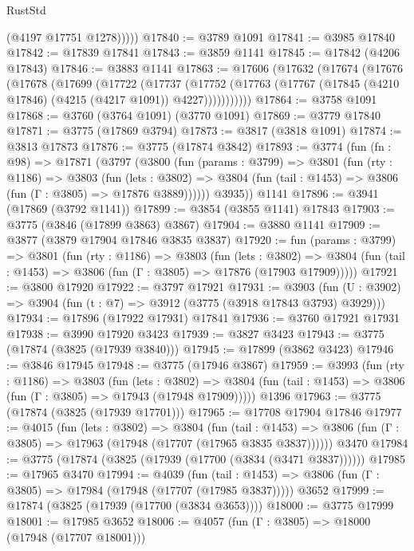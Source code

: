\begin{lexlean}{RustStd}
\begin{coremodule}
            (@4197 @17751 @1278)))))
@17840 := @3789 @1091
@17841 := @3985 @17840
@17842 := @17839 @17841
@17843 := @3859 @1141
@17845 := @17842 (@4206 @17843)
@17846 := @3883 @1141
@17863 := @17606
    (@17632
      (@17674
        (@17676
          (@17678
            (@17699
              (@17722
                (@17737
                  (@17752
                    (@17763 (@17767 (@17845 (@4210 @17846) (@4215 (@4217 @1091)) @4227)))))))))))
@17864 := @3758 @1091
@17868 := @3760 (@3764 @1091) (@3770 @1091)
@17869 := @3779 @17840
@17871 := @3775 (@17869 @3794)
@17873 := @3817 (@3818 @1091)
@17874 := @3813 @17873
@17876 := @3775 (@17874 @3842)
@17893 := @3774
    (fun (fn : @98) =>
    @17871
      (@3797
        (@3800
          (fun (params : @3799) =>
          @3801
            (fun (rty : @1186) =>
            @3803
              (fun (lets : @3802) =>
              @3804 (fun (tail : @1453) => @3806 (fun (Γ : @3805) => @17876 @3889))))))
        @3935))
    @1141
@17896 := @3941 (@17869 (@3792 @1141))
@17899 := @3854 (@3855 @1141) @17843
@17903 := @3775 (@3846 (@17899 @3863) @3867)
@17904 := @3880 @1141
@17909 := @3877 (@3879 @17904 @17846 @3835 @3837)
@17920 := fun (params : @3799) =>
  @3801
    (fun (rty : @1186) =>
    @3803
      (fun (lets : @3802) =>
      @3804 (fun (tail : @1453) => @3806 (fun (Γ : @3805) => @17876 (@17903 @17909)))))
@17921 := @3800 @17920
@17922 := @3797 @17921
@17931 := @3903
    (fun (U : @3902) => @3904 (fun (t : @7) => @3912 (@3775 (@3918 @17843 @3793) @3929)))
@17934 := @17896 (@17922 @17931) @17841
@17936 := @3760 @17921 @17931
@17938 := @3990 @17920 @3423
@17939 := @3827 @3423
@17943 := @3775 (@17874 (@3825 (@17939 @3840)))
@17945 := @17899 (@3862 @3423)
@17946 := @3846 @17945
@17948 := @3775 (@17946 @3867)
@17959 := @3993
    (fun (rty : @1186) =>
    @3803
      (fun (lets : @3802) =>
      @3804 (fun (tail : @1453) => @3806 (fun (Γ : @3805) => @17943 (@17948 @17909)))))
    @1396
@17963 := @3775 (@17874 (@3825 (@17939 @17701)))
@17965 := @17708 @17904 @17846
@17977 := @4015
    (fun (lets : @3802) =>
    @3804
      (fun (tail : @1453) =>
      @3806 (fun (Γ : @3805) => @17963 (@17948 (@17707 (@17965 @3835 @3837))))))
    @3470
@17984 := @3775 (@17874 (@3825 (@17939 (@17700 (@3834 (@3471 @3837))))))
@17985 := @17965 @3470
@17994 := @4039
    (fun (tail : @1453) => @3806 (fun (Γ : @3805) => @17984 (@17948 (@17707 (@17985 @3837)))))
    @3652
@17999 := @17874 (@3825 (@17939 (@17700 (@3834 @3653))))
@18000 := @3775 @17999
@18001 := @17985 @3652
@18006 := @4057 (fun (Γ : @3805) => @18000 (@17948 (@17707 @18001)))

\end{coremodule}
\end{lexlean}
